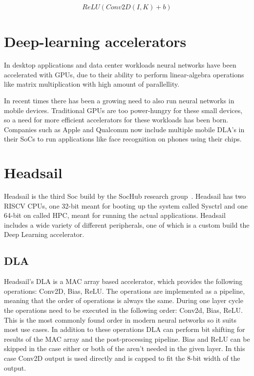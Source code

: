 \documentclass[12pt,a4paper,english
]{tunithesis}
\begin{document}
\begin{align}
  ReLU(Conv2D(I, K) + b)
\end{align}


\section{Deep-learning accelerators}
\label{sec:dlas}
In desktop applications and data center workloads neural networks have been accelerated with GPUs, due to their ability to perform linear-algebra operations like matrix multiplication with high amount of parallellity.

In recent times there has been a growing need to also run neural networks in mobile devices. Traditional GPUs are too power-hungry for these small devices, so a need for more efficient accelerators for these workloads has been born. Companies such as Apple and Qualcomm now include multiple mobile DLA's in their SoCs to run applications like face recognition on phones using their chips.

\section{Headsail}
Headsail is the third Soc build by the SocHub research group~\parencite{Ballast}. Headsail has two RISCV CPUs, one 32-bit meant for booting up the system called Sysctrl and one 64-bit on called HPC, meant for running the actual applications.
Headsail includes a wide variety of different peripherals, one of which is a custom build the Deep Learning accelerator.

\subsection{DLA}
Headsail's DLA is a MAC array based accelerator, which provides the following operations: Conv2D, Bias, ReLU. The operations are implemented as a pipeline, meaning that the order of operations is always the same. During one layer cycle the operations need to be executed in the following order: Conv2d, Bias, ReLU. This is the most commonly found order in modern neural networks so it suits most use cases. In addition to these operations DLA can perform bit shifting for results of the MAC array and the post-processing pipeline.
Bias and ReLU can be skipped in the case either or both of the aren't needed in the given layer. In this case Conv2D output is used directly and is capped to fit the 8-bit width of the output.
\end{document}

